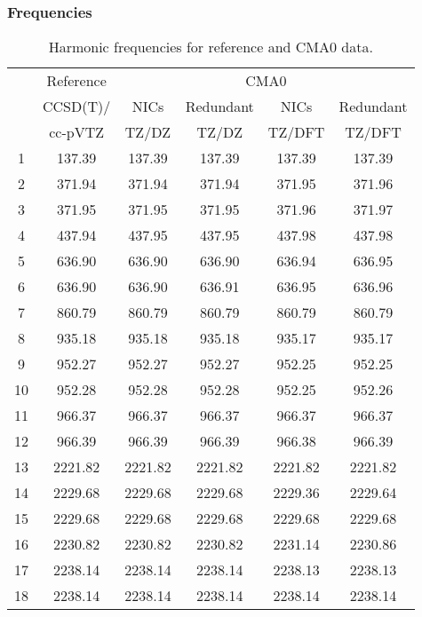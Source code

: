 \documentclass[10pt,oneside]{article}
\begin{document}
\begin{table}[h!]
\subsubsection*{Frequencies}
\centering
\caption{Harmonic frequencies for reference and CMA0 data.}
\begin{tabular}{cccccc}
\toprule
{} & Reference & \multicolumn{4}{c}{CMA0} \\
{} &  CCSD(T)/ &    NICs &  Redundant &    NICs & Redundant \\
{} &   cc-pVTZ &   TZ/DZ &      TZ/DZ &  TZ/DFT &    TZ/DFT \\
\midrule
1  &    137.39 &  137.39 &     137.39 &  137.39 &    137.39 \\
2  &    371.94 &  371.94 &     371.94 &  371.95 &    371.96 \\
3  &    371.95 &  371.95 &     371.95 &  371.96 &    371.97 \\
4  &    437.94 &  437.95 &     437.95 &  437.98 &    437.98 \\
5  &    636.90 &  636.90 &     636.90 &  636.94 &    636.95 \\
6  &    636.90 &  636.90 &     636.91 &  636.95 &    636.96 \\
7  &    860.79 &  860.79 &     860.79 &  860.79 &    860.79 \\
8  &    935.18 &  935.18 &     935.18 &  935.17 &    935.17 \\
9  &    952.27 &  952.27 &     952.27 &  952.25 &    952.25 \\
10 &    952.28 &  952.28 &     952.28 &  952.25 &    952.26 \\
11 &    966.37 &  966.37 &     966.37 &  966.37 &    966.37 \\
12 &    966.39 &  966.39 &     966.39 &  966.38 &    966.39 \\
13 &   2221.82 & 2221.82 &    2221.82 & 2221.82 &   2221.82 \\
14 &   2229.68 & 2229.68 &    2229.68 & 2229.36 &   2229.64 \\
15 &   2229.68 & 2229.68 &    2229.68 & 2229.68 &   2229.68 \\
16 &   2230.82 & 2230.82 &    2230.82 & 2231.14 &   2230.86 \\
17 &   2238.14 & 2238.14 &    2238.14 & 2238.13 &   2238.13 \\
18 &   2238.14 & 2238.14 &    2238.14 & 2238.14 &   2238.14 \\
\bottomrule
\end{tabular}
\end{table}
\end{document}
